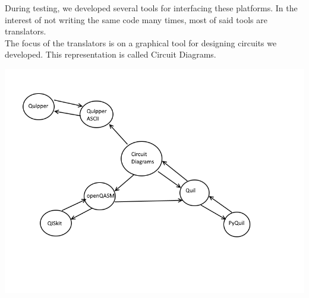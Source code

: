 \documentclass[a4paper,10pt]{article}
\begin{document}
During testing, we developed several tools for interfacing these platforms. In the interest of not writing the same code many times, most of said tools are translators. \\
The focus of the translators is on a graphical tool for designing circuits we developed. This representation is called Circuit Diagrams.

\begin{center}
\includegraphics[width=15cm]{translation}
\end{center}
\end{document}
